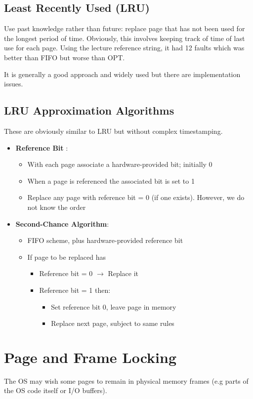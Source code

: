 \documentclass[11pt]{article}
\begin{document}
\subsection{Least Recently Used (LRU)}
\label{sec:org667c3e1}
Use past knowledge rather than future: replace page that has not been used for the longest period of time.
Obviously, this involves keeping track of time of last use for each page.
Using the lecture reference string, it had 12 faults which was better than FIFO but worse than OPT.

It is generally a good approach and widely used but there are implementation issues.

\subsection{LRU Approximation Algorithms}
\label{sec:org8743693}
These are obviously similar to LRU but without complex timestamping.
\begin{itemize}
\item \textbf{Reference Bit} :
\begin{itemize}
\item With each page associate a hardware-provided bit; initially 0
\item When a page is referenced the associated bit is set to 1
\item Replace any page with reference bit = 0 (if one exists). However, we do not know the order
\end{itemize}
\item \textbf{Second-Chance Algorithm}:
\begin{itemize}
\item FIFO scheme, plus hardware-provided reference bit
\item If page to be replaced has
\begin{itemize}
\item Reference bit = 0 \(\rightarrow\) Replace it
\item Reference bit = 1 then:
\begin{itemize}
\item Set reference bit 0, leave page in memory
\item Replace next page, subject to same rules
\end{itemize}
\end{itemize}
\end{itemize}
\end{itemize}

\section{Page and Frame Locking}
\label{sec:org93176bc}
The OS may wish some pages to remain in physical memory frames (e.g parts of the OS code itself or I/O buffers).
\end{document}
